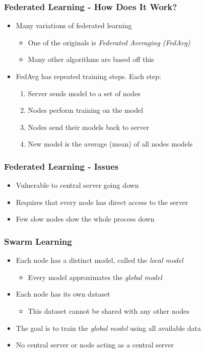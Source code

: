 \documentclass{beamer}
\begin{document}
	\begin{frame}
		\frametitle{Federated Learning - How Does It Work?}
		\begin{itemize}
			\item Many variations of federated learning
			\begin{itemize}
				\item One of the originals is \emph{Federated Averaging (FedAvg)}
				\item Many other algorithms are based off this
			\end{itemize}
			\item FedAvg has repeated training steps. Each step:
			\begin{enumerate}
				\item Server sends model to a set of nodes
				\item Nodes perform training on the model
				\item Nodes send their models back to server
				\item New model is the average (mean) of all nodes models
			\end{enumerate}
		\end{itemize}
	\end{frame}

	\begin{frame}
		\frametitle{Federated Learning - Issues}
		\begin{itemize}
			\item Vulnerable to central server going down
			\item Requires that every node has direct access to the server
			\item Few slow nodes slow the whole process down
		\end{itemize}
	\end{frame}


	\begin{frame}
		\frametitle{Swarm Learning}
		\begin{itemize}
			\item Each node has a distinct model, called the \emph{local model}
			\begin{itemize}
				\item Every model approximates the \emph{global model}
			\end{itemize}
			\item Each node has its own dataset
			\begin{itemize}
				\item This dataset cannot be shared with any other nodes
			\end{itemize}
			\item The goal is to train the \emph{global model} using all available data
			\item No central server or node acting as a central server 
		\end{itemize}
	\end{frame}
\end{document}
